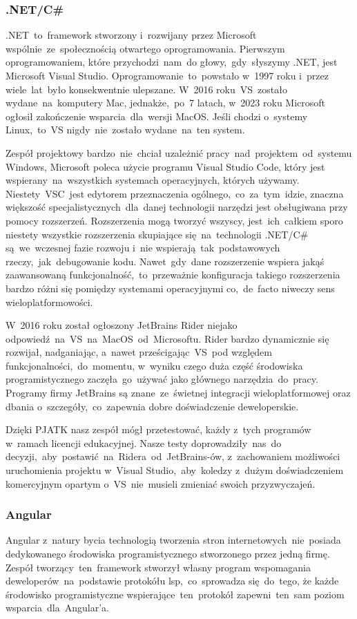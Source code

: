 \subsubsection{.NET/C\#}
.NET~to~framework stworzony i~rozwijany przez Microsoft wspólnie~ze~społecznością otwartego oprogramowania.
Pierwszym oprogramowaniem, które przychodzi~nam~do głowy,~gdy~słyszymy .NET, jest Microsoft Visual Studio.
Oprogramowanie~to~powstało w~1997 roku i~przez wiele~lat~było konsekwentnie ulepszane.
W~2016 roku~VS~zostało wydane~na~komputery Mac, jednakże,~po~7 latach, w~2023 roku Microsoft ogłosił zakończenie wsparcia~dla~wersji MacOS.
Jeśli chodzi o~systemy Linux,~to~VS nigdy~nie~zostało wydane~na~ten system.

Zespół projektowy bardzo~nie~chciał uzależnić pracy~nad~projektem~od~systemu Windows, Microsoft poleca użycie programu Visual Studio Code, który jest wspierany~na~wszystkich systemach operacyjnych, których używamy.
Niestety~VSC~jest edytorem przeznaczenia ogólnego,~co~za~tym~idzie, znaczna większość specjalistycznych~dla~danej technologii narzędzi jest obsługiwana przy pomocy rozszerzeń.
Rozszerzenia mogą tworzyć wszyscy, jest~ich~całkiem sporo niestety wszystkie rozszerzenia skupiające się~na~technologii .NET/C\# są~we~wczesnej fazie rozwoju i~nie wspierają~tak~podstawowych rzeczy,~jak~debugowanie kodu.
Nawet~gdy~dane rozszerzenie wspiera jakąś zaawansowaną funkcjonalność,~to~przeważnie konfiguracja takiego rozszerzenia bardzo różni się pomiędzy systemami operacyjnymi co,~de~facto niweczy sens wieloplatformowości.

W~2016 roku został ogłoszony JetBrains Rider niejako odpowiedź~na~VS~na~MacOS~od~Microsoftu.
Rider bardzo dynamicznie się rozwijał, nadganiając, a~nawet prześcigając~VS~pod względem funkcjonalności,~do~momentu, w~wyniku czego duża część środowiska programistycznego zaczęła~go~używać jako głównego narzędzia~do~pracy.
Programy firmy JetBrains są znane~ze~świetnej integracji wieloplatformowej oraz dbania o~szczegóły,~co~zapewnia dobre doświadczenie deweloperskie.

Dzięki PJATK nasz zespół mógł przetestować, każdy z~tych programów w~ramach licencji edukacyjnej.
Nasze testy doprowadziły~nas~do decyzji,~aby~postawić~na~Ridera~od~JetBrains-ów, z~zachowaniem możliwości uruchomienia projektu w~Visual Studio,~aby~koledzy z~dużym doświadczeniem komercyjnym opartym o~VS~nie~musieli zmieniać swoich przyzwyczajeń.

\subsubsection{Angular}
Angular z~natury bycia technologią tworzenia stron internetowych~nie~posiada dedykowanego środowiska programistycznego stworzonego przez jedną firmę.
Zespół tworzący~ten~framework stworzył własny program wspomagania deweloperów~na~podstawie protokółu \acrshort{lsp},~co~sprowadza się~do~tego, że każde środowisko programistyczne wspierające~ten~protokół zapewni~ten~sam poziom wsparcia~dla~Angular'a.

